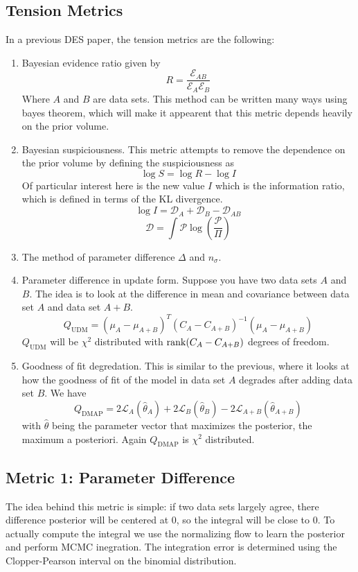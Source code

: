 \subsection{Tension Metrics}
In a previous DES paper, the tension metrics are the following:
\begin{enumerate}
    \item Bayesian evidence ratio given by
	\[ R = \frac{\mathcal{E}_{AB}}{\mathcal{E}_A\mathcal{E}_B} \]
	Where $A$ and $B$ are data sets. This method can be written many ways using bayes theorem, which will make it appearent that this metric depends heavily on the prior volume.
    \item Bayesian suspiciousness. This metric attempts to remove the dependence on the prior volume by defining the suspiciousness as 
	\[ \log S = \log R - \log I \]
	Of particular interest here is the new value $I$ which is the information ratio, which is defined in terms of the KL divergence.
	\[ \log I = \mathcal{D}_A + \mathcal{D}_B - \mathcal{D}_{AB} \]
	\[ \mathcal{D} = \int \mathcal{P} \log(\frac{\mathcal{P}}{\Pi}) \]
    \item The method of parameter difference $\Delta$ and $n_\sigma$.
    \item Parameter difference in update form. Suppose you have two data sets $A$ and $B$. The idea is to look at the difference in mean and covariance between data set $A$ and data set $A+B$.
	\[Q_{\mathrm{UDM}} = {(\mu_A - \mu_{A+B})}^T{(C_A-C_{A+B})}^{-1}(\mu_A - \mu_{A+B}) \]
	$Q_{\mathrm{UDM}}$ will be $\chi^2$ distributed with $\rank(C_A-C_{A+B})$ degrees of freedom.
    \item Goodness of fit degredation. This is similar to the previous, where it looks at how the goodness of fit of the model in data set $A$ degrades after adding data set $B$. We have
	\[ Q_{\mathrm{DMAP}} = 2\mathcal{L}_{A}(\hat{\theta}_A) + 2\mathcal{L}_B(\hat\theta_B) - 2 \mathcal{L}_{A+B}(\hat\theta_{A+B}) \]
	with $\hat{\theta}$ being the parameter vector that maximizes the posterior, the maximum a posteriori. Again $Q_{\mathrm{DMAP}}$ is $\chi^2$ distributed. 
\end{enumerate}

\subsection{Metric 1: Parameter Difference}
The idea behind this metric is simple: if two data sets largely agree, there difference posterior will be centered at 0, so the integral will be close to 0.
To actually compute the integral we use the normalizing flow to learn the posterior and perform MCMC inegration. The integration error is determined using the Clopper-Pearson interval on the binomial distribution.

